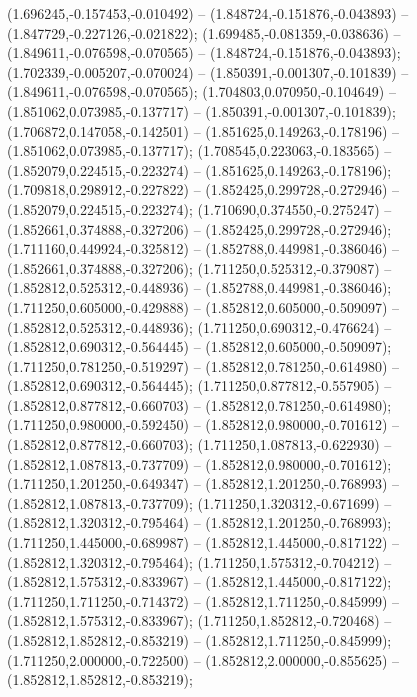  (1.696245,-0.157453,-0.010492) -- (1.848724,-0.151876,-0.043893) -- (1.847729,-0.227126,-0.021822);
 (1.699485,-0.081359,-0.038636) -- (1.849611,-0.076598,-0.070565) -- (1.848724,-0.151876,-0.043893);
 (1.702339,-0.005207,-0.070024) -- (1.850391,-0.001307,-0.101839) -- (1.849611,-0.076598,-0.070565);
 (1.704803,0.070950,-0.104649) -- (1.851062,0.073985,-0.137717) -- (1.850391,-0.001307,-0.101839);
 (1.706872,0.147058,-0.142501) -- (1.851625,0.149263,-0.178196) -- (1.851062,0.073985,-0.137717);
 (1.708545,0.223063,-0.183565) -- (1.852079,0.224515,-0.223274) -- (1.851625,0.149263,-0.178196);
 (1.709818,0.298912,-0.227822) -- (1.852425,0.299728,-0.272946) -- (1.852079,0.224515,-0.223274);
 (1.710690,0.374550,-0.275247) -- (1.852661,0.374888,-0.327206) -- (1.852425,0.299728,-0.272946);
 (1.711160,0.449924,-0.325812) -- (1.852788,0.449981,-0.386046) -- (1.852661,0.374888,-0.327206);
 (1.711250,0.525312,-0.379087) -- (1.852812,0.525312,-0.448936) -- (1.852788,0.449981,-0.386046);
 (1.711250,0.605000,-0.429888) -- (1.852812,0.605000,-0.509097) -- (1.852812,0.525312,-0.448936);
 (1.711250,0.690312,-0.476624) -- (1.852812,0.690312,-0.564445) -- (1.852812,0.605000,-0.509097);
 (1.711250,0.781250,-0.519297) -- (1.852812,0.781250,-0.614980) -- (1.852812,0.690312,-0.564445);
 (1.711250,0.877812,-0.557905) -- (1.852812,0.877812,-0.660703) -- (1.852812,0.781250,-0.614980);
 (1.711250,0.980000,-0.592450) -- (1.852812,0.980000,-0.701612) -- (1.852812,0.877812,-0.660703);
 (1.711250,1.087813,-0.622930) -- (1.852812,1.087813,-0.737709) -- (1.852812,0.980000,-0.701612);
 (1.711250,1.201250,-0.649347) -- (1.852812,1.201250,-0.768993) -- (1.852812,1.087813,-0.737709);
 (1.711250,1.320312,-0.671699) -- (1.852812,1.320312,-0.795464) -- (1.852812,1.201250,-0.768993);
 (1.711250,1.445000,-0.689987) -- (1.852812,1.445000,-0.817122) -- (1.852812,1.320312,-0.795464);
 (1.711250,1.575312,-0.704212) -- (1.852812,1.575312,-0.833967) -- (1.852812,1.445000,-0.817122);
 (1.711250,1.711250,-0.714372) -- (1.852812,1.711250,-0.845999) -- (1.852812,1.575312,-0.833967);
 (1.711250,1.852812,-0.720468) -- (1.852812,1.852812,-0.853219) -- (1.852812,1.711250,-0.845999);
 (1.711250,2.000000,-0.722500) -- (1.852812,2.000000,-0.855625) -- (1.852812,1.852812,-0.853219);
